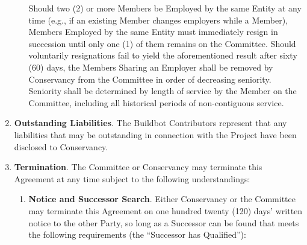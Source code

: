 \documentclass[letterpaper,12pt]{article}
\begin{document}
\begin{enumerate}[label=\arabic*.,ref=\S~\arabic*]
\begin{enumerate}[label=\alph*.,ref=\theenumi(\alph*)]
Should two (2) or more Members be Employed by the same Entity at any
time (e.g., if an existing Member changes employers while a Member),
Members Employed by the same Entity must immediately resign in succession
until only one (1) of them remains on the Committee. Should voluntarily
resignations fail to yield the aforementioned result after sixty (60)
days, the Members Sharing an Employer shall be removed by Conservancy
from the Committee in order of decreasing seniority. Seniority shall
be determined by length of service by the Member on the Committee,
including all historical periods of non-contiguous service.

\end{enumerate}

\item \textbf{Outstanding Liabilities}. The Buildbot Contributors represent
that any liabilities that may be outstanding in connection with the
Project have been disclosed to Conservancy. 

\item \textbf{Termination}. \label{Termination} The Committee or Conservancy
may terminate this Agreement at any time subject to the following
understandings:


\begin{enumerate}[label=\alph*.,ref=\theenumi(\arabic*)]

\item \textbf{Notice and Successor Search}. Either Conservancy or the Committee
may terminate this Agreement on one hundred twenty (120) days' written notice to
the other Party, so long as a Successor can be found that meets the
following requirements (the ``Successor has Qualified''):



\end{enumerate}
\end{enumerate}
\end{document}

